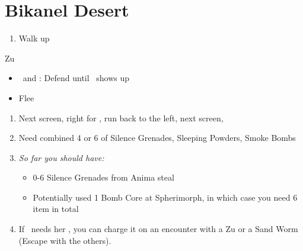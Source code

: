\chapter{Bikanel Desert}

\begin{enumerate}
    \item Walk up
\end{enumerate}
\begin{battle}{Zu}
    \begin{itemize}
        \tidusf Attack
        \enemyf Attack
        \tidusf Equip Sonic Steel
        \item \tidus\ and \auron: Defend until \lulu\ shows up
        \item Flee
    \end{itemize}
\end{battle}
\begin{enumerate}[resume]
    \item Next screen, right for \kimahri, run back to the left, next screen, \save
    \item Need combined 4 or 6 of Silence Grenades, Sleeping Powders, Smoke Bombs
    \item \textit{So far you should have:}
    \begin{itemize}
        \item 0-6 Silence Grenades from Anima steal
        \item Potentially used 1 Bomb Core at Spherimorph, in which case you need 6 item in total
    \end{itemize}
    \item If \rikku\ needs her \od, you can charge it on an encounter with a Zu or a Sand Worm (Escape with the others).
\end{enumerate}
